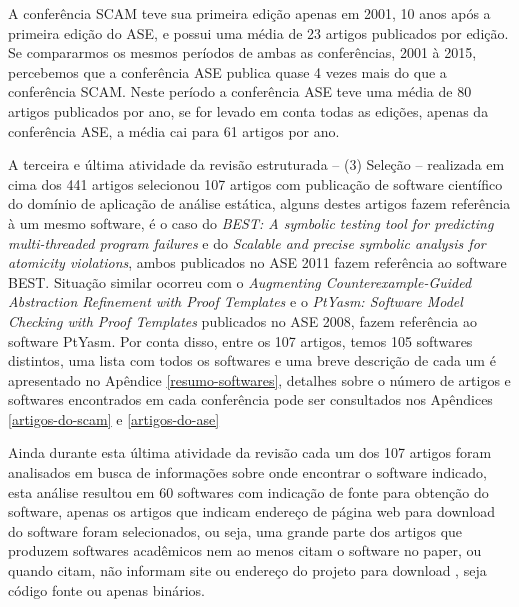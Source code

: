 A conferência SCAM teve sua primeira edição apenas em 2001, 10 anos após a
primeira edição do ASE, e possui uma média de 23 artigos publicados por edição.
Se compararmos os mesmos períodos de ambas as conferências, 2001 à 2015,
percebemos que a conferência ASE publica quase 4 vezes mais do que a
conferência SCAM. Neste período a conferência ASE teve uma média de 80 artigos
publicados por ano, se for levado em conta todas as edições, apenas da
conferência ASE, a média cai para 61 artigos por ano.


A terceira e última atividade da revisão estruturada -- (3) Seleção --
realizada em cima dos 441 artigos selecionou 107 artigos com publicação de
software científico do domínio de aplicação de análise estática, alguns destes
artigos fazem referência à um mesmo software, é o caso do {\it BEST: A symbolic
testing tool for predicting multi-threaded program failures} e do {\it Scalable
and precise symbolic analysis for atomicity violations}, ambos publicados no
ASE 2011 fazem referência ao software BEST. Situação similar ocorreu com o {\it Augmenting
Counterexample-Guided Abstraction Refinement with Proof Templates} e o {\it
PtYasm: Software Model Checking with Proof Templates} publicados no ASE 2008,
fazem referência ao software PtYasm. Por conta disso, entre os 107 artigos, temos
105 softwares distintos, uma lista com todos os softwares e uma breve descrição
de cada um é apresentado no Apêndice \ref{resumo-softwares},
detalhes sobre o número de artigos e softwares encontrados em cada conferência
pode ser consultados nos Apêndices \ref{artigos-do-scam} e \ref{artigos-do-ase} 

Ainda durante esta última atividade da revisão cada um dos 107 artigos foram
analisados em busca de informações sobre onde encontrar o software indicado,
esta análise resultou em 60 softwares com indicação de fonte para obtenção do
software, apenas os artigos que indicam endereço de página web para download do
software foram selecionados, ou seja, uma grande parte dos artigos que produzem
softwares acadêmicos nem ao menos citam o software no paper, ou quando citam,
não informam site ou endereço do projeto para download
\cite{allen2017engineering}, seja código fonte ou apenas binários.

